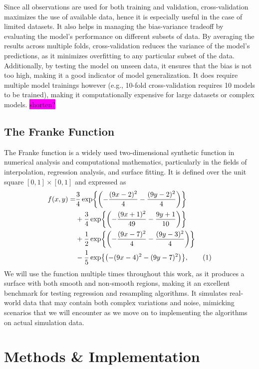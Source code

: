 \documentclass[aps,pra,english,notitlepage,reprint,nofootinbib]{revtex4-1}  %
\newcommand\numberthis{\addtocounter{equation}{1}\tag{\theequation}}
\begin{document}
Since all observations are used for both training and validation, cross-validation maximizes the use of available data, hence it is especially useful in the case of limited datasets. It also helps in managing the bias-variance tradeoff by evaluating the model's performance on different subsets of data. By averaging the results across multiple folds, cross-validation reduces the variance of the model's predictions, as it minimizes overfitting to any particular subset of the data. Additionally, by testing the model on unseen data, it ensures that the bias is not too high, making it a good indicator of model generalization. It does require multiple model trainings however (e.g., 10-fold cross-validation requires 10 models to be trained), making it computationally expensive for large datasets or complex models.
\colorbox{magenta}{shorten?}


\subsection{The Franke Function}\label{subsec:franke}
The Franke function is a widely used two-dimensional synthetic function in numerical analysis and computational mathematics, particularly in the fields of interpolation, regression analysis, and surface fitting. It is defined over the unit square $[0, 1] \times [0, 1]$ and expressed as
\begin{align*}
  f(x,y) =& \frac{3}{4} \exp{\left( -\frac{(9x - 2)^2}{4} - \frac{(9y - 2)^2}{4} \right)} \\
&+ \frac{3}{4} \exp{\left( -\frac{(9x + 1)^2}{49} - \frac{9y + 1}{10} \right)} \\
&+ \frac{1}{2} \exp{\left( -\frac{(9x - 7)^2}{4} - \frac{(9y - 3)^2}{4} \right)} \\
&- \frac{1}{5} \exp{\left( -(9x - 4)^2 - (9y - 7)^2 \right)}, \numberthis\label{eq:Franke}
\end{align*}
We will use the function multiple times throughout this work, as it produces a surface with both smooth and non-smooth regions, making it an excellent benchmark for testing regression and resampling algorithms. It simulates real-world data that may contain both complex variations and noise, mimicking scenarios that we will encounter as we move on to implementing the algorithms on actual simulation data.


\section{Methods \& Implementation}\label{sec:methods}
\end{document}
